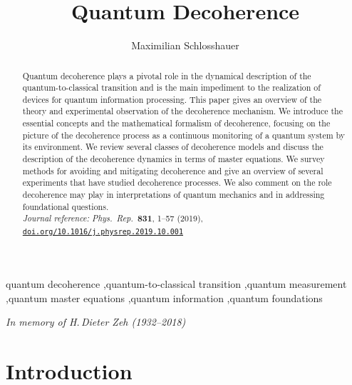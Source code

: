 \documentclass[3p,sort&compress]{elsarticle}
\begin{document}
\begin{frontmatter}

\title{Quantum Decoherence}
\author{Maximilian Schlosshauer} 
\address{Department of Physics, University of Portland,\\5000 North Willamette Boulevard, Portland, OR 97203, USA}

\begin{abstract}
Quantum decoherence plays a pivotal role in the dynamical description of the quantum-to-classical transition and is the main impediment to the realization of devices for quantum information processing. This paper gives an overview of the theory and experimental observation of the decoherence mechanism. We introduce the essential concepts and the mathematical formalism of decoherence, focusing on the picture of the decoherence process as a continuous monitoring of a quantum system by its environment. We review several classes of decoherence models and discuss the description of the decoherence dynamics in terms of master equations. We survey methods for avoiding and mitigating decoherence and give an overview of several experiments that have studied decoherence processes. We also comment on the role decoherence may play in interpretations of quantum mechanics and in addressing foundational questions.\\[.2cm]
\emph{Journal reference:} \emph{Phys.\ Rep.\ }{\bf 831}, 1--57 (2019), \href{https://doi.org/10.1016/j.physrep.2019.10.001}{\texttt{doi.org/10.1016/j.physrep.2019.10.001}}
\end{abstract}

\begin{keyword}
quantum decoherence \sep quantum-to-classical transition \sep quantum measurement \sep quantum master equations \sep quantum information \sep quantum foundations 
\end{keyword}

\end{frontmatter}

\vspace{.4cm}

\begin{center}
\emph{In memory of H.\,Dieter Zeh (1932--2018)}
\end{center}

\tableofcontents

\section{Introduction}
\end{document}
